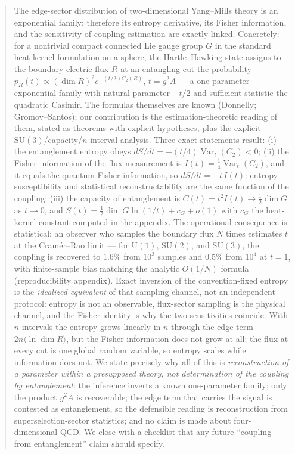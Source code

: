 \documentclass[11pt]{article}
\theoremstyle{remark}
\theoremstyle{plain}
\newcommand{\Var}{\operatorname{Var}}
\newcommand{\dG}{\dim G}
\begin{document}
\begin{abstract}
The edge-sector distribution of two-dimensional Yang--Mills theory is an exponential family; therefore its entropy derivative, its Fisher information, and the sensitivity of coupling estimation are exactly linked. Concretely: for a nontrivial compact connected Lie gauge group $G$ in the standard heat-kernel formulation on a sphere, the Hartle--Hawking state assigns to the boundary electric flux $R$ at an entangling cut the probability $p_R(t) \propto (\dim R)^2 e^{-(t/2)C_2(R)}$, $t = g^2 A$ --- a one-parameter exponential family with natural parameter $-t/2$ and sufficient statistic the quadratic Casimir. The formulas themselves are known (Donnelly; Gromov--Santos); our contribution is the estimation-theoretic reading of them, stated as theorems with explicit hypotheses, plus the explicit $\mathrm{SU}(3)$/capacity/$n$-interval analysis. Three exact statements result: (i) the entanglement entropy obeys $dS/dt = -(t/4)\Var_t(C_2) < 0$; (ii) the Fisher information of the flux measurement is $I(t) = \tfrac14\Var_t(C_2)$, and it equals the quantum Fisher information, so $dS/dt = -t\,I(t)$: entropy susceptibility and statistical reconstructability are the same function of the coupling; (iii) the capacity of entanglement is $C(t) = t^2 I(t) \to \tfrac12\dG$ as $t \to 0$, and $S(t) = \tfrac12\dG\ln(1/t) + c_G + o(1)$ with $c_G$ the heat-kernel constant computed in the appendix. The operational consequence is statistical: an observer who samples the boundary flux $N$ times estimates $t$ at the Cram\'er--Rao limit --- for $\mathrm{U}(1)$, $\mathrm{SU}(2)$, and $\mathrm{SU}(3)$, the coupling is recovered to $1.6\%$ from $10^3$ samples and $0.5\%$ from $10^4$ at $t = 1$, with finite-sample bias matching the analytic $O(1/N)$ formula (reproducibility appendix). Exact inversion of the convention-fixed entropy is the \emph{idealized equivalent} of that sampling channel, not an independent protocol: entropy is not an observable, flux-sector sampling is the physical channel, and the Fisher identity is why the two sensitivities coincide. With $n$ intervals the entropy grows linearly in $n$ through the edge term $2n\langle \ln \dim R\rangle$, but the Fisher information does not grow at all: the flux at every cut is one global random variable, so entropy scales while information does not. We state precisely why all of this is \emph{reconstruction of a parameter within a presupposed theory, not determination of the coupling by entanglement}: the inference inverts a known one-parameter family; only the product $g^2 A$ is recoverable; the edge term that carries the signal is contested as entanglement, so the defensible reading is reconstruction from superselection-sector statistics; and no claim is made about four-dimensional QCD. We close with a checklist that any future ``coupling from entanglement'' claim should specify.
\end{abstract}
\end{document}
